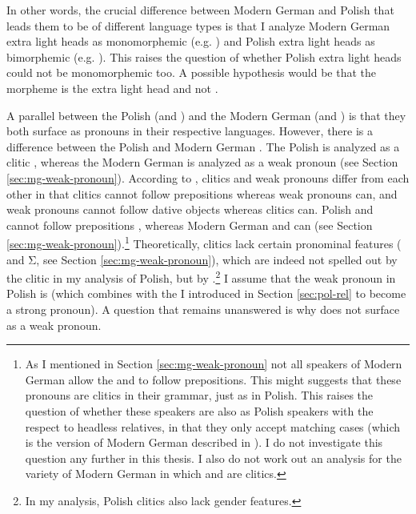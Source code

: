 In other words, the crucial difference between Modern German and Polish that leads them to be of different language types is that I analyze Modern German extra light heads as monomorphemic (e.g. ) and Polish extra light heads as bimorphemic (e.g. ).
This raises the question of whether Polish extra light heads could not be monomorphemic too. A possible hypothesis would be that the morpheme  is the extra light head and not .

A parallel between the Polish  (and ) and the Modern German  (and ) is that they both surface as pronouns in their respective languages. However, there is a difference between the Polish  and Modern German . The Polish  is analyzed as a clitic \citep{swan2002}, whereas the Modern German  is analyzed as a weak pronoun (see Section \ref{sec:mg-weak-pronoun}).
According to \citet{cardinaletti1994}, clitics and weak pronouns differ from each other in that clitics cannot follow prepositions whereas weak pronouns can, and weak pronouns cannot follow dative objects whereas clitics can. Polish  and  cannot follow prepositions , whereas Modern German  and  can (see Section \ref{sec:mg-weak-pronoun}).\footnote{
As I mentioned in Section \ref{sec:mg-weak-pronoun} not all speakers of Modern German allow the  and  to follow prepositions. This might suggests that these pronouns are clitics in their grammar, just as in Polish. This raises the question of whether these speakers are also as Polish speakers with the respect to headless relatives, in that they only accept matching cases (which is the version of Modern German described in \citealt{groos1981}).
I do not investigate this question any further in this thesis.
I also do not work out an analysis for the variety of Modern German in which  and  are clitics.
}
Theoretically, clitics lack certain pronominal features ( and Σ, see Section \ref{sec:mg-weak-pronoun}), which are indeed not spelled out by the clitic in my analysis of Polish, but by .\footnote{
In my analysis, Polish clitics also lack gender features.
}
I assume that the weak pronoun in Polish is  (which combines with the  I introduced in Section \ref{sec:pol-rel} to become a strong pronoun). A question that remains unanswered is why  does not surface as a weak pronoun.
